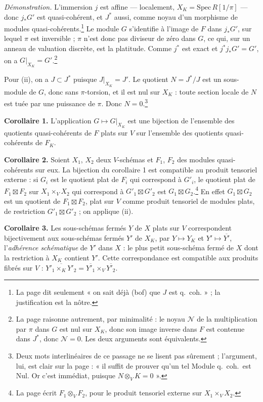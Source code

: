 \documentclass[11pt,a4paper]{article}
\begin{document}
\emph{Démonstration.} L'immersion $j$ est affine --- localement,
$X_K = \mathrm{Spec}\, R[1/\pi]$ --- donc $j_{*}G'$ est quasi-cohérent, et
$J^{*}$ aussi, comme noyau d'un morphisme de modules
quasi-cohérents.\footnote{La page dit seulement « on sait déjà (bof) que $J$
est q.\ coh. » ; la justification est la nôtre.} Le module $G$ s'identifie à
l'image de $F$ dans $j_{*}G'$, sur lequel $\pi$ est inversible ; $\pi$ n'est
donc pas diviseur de zéro dans $G$, ce qui, sur un anneau de valuation
discrète, est la platitude. Comme $j^{*}$ est exact et $j^{*}j_{*}G' = G'$, on
a $G|_{X_K} = G'$.\footnote{La page raisonne autrement, par minimalité : le
noyau $\mathcal{N}$ de la multiplication par $\pi$ dans $G$ est nul sur $X_K$,
donc son image inverse dans $F$ est contenue dans $J^{*}$, donc
$\mathcal{N} = 0$. Les deux arguments sont équivalents.}

Pour (ii), on a $J \subset J^{*}$ puisque $J|_{X_K} = J'$. Le quotient
$N = J^{*}/J$ est un sous-module de $G$, donc sans $\pi$-torsion, et il est nul
sur $X_K$ : toute section locale de $N$ est tuée par une puissance de $\pi$.
Donc $N = 0$.\footnote{Deux mots interlinéaires de ce passage ne se lisent pas
sûrement ; l'argument, lui, est clair sur la page : « il suffit de prouver
qu'un tel Module q.\ coh.\ est Nul. Or c'est immédiat, puisque
$N \otimes_V K = 0$ ».}

\textbf{Corollaire 1.} L'application $G \mapsto G|_{X_K}$ est une bijection de
l'ensemble des quotients quasi-cohérents de $F$ plats sur $V$ sur l'ensemble
des quotients quasi-cohérents de $F_K$.

\textbf{Corollaire 2.} Soient $X_1$, $X_2$ deux $V$-schémas et $F_1$, $F_2$
des modules quasi-cohérents sur eux. La bijection du corollaire 1 est
compatible au produit tensoriel externe : si $G_i$ est le quotient plat de
$F_i$ qui correspond à $G'_i$, le quotient plat de $F_1 \boxtimes F_2$ sur
$X_1 \times_V X_2$ qui correspond à $G'_1 \boxtimes G'_2$ est
$G_1 \boxtimes G_2$.\footnote{La page écrit $F_1 \otimes_V F_2$, pour le
produit tensoriel externe sur $X_1 \times_V X_2$.} En effet $G_1 \boxtimes G_2$
est un quotient de $F_1 \boxtimes F_2$, plat sur $V$ comme produit tensoriel
de modules plats, de restriction $G'_1 \boxtimes G'_2$ ; on applique (ii).

\textbf{Corollaire 3.} Les sous-schémas fermés $Y$ de $X$ plats sur $V$
correspondent bijectivement aux sous-schémas fermés $Y'$ de $X_K$, par
$Y \mapsto Y_K$ et $Y' \mapsto \overline{Y'}$, l'\emph{adhérence
schématique} de $Y'$ dans $X$ : le plus petit sous-schéma fermé de $X$ dont la
restriction à $X_K$ contient $Y'$. Cette correspondance est compatible aux
produits fibrés sur $V$ :
$\overline{Y'_1 \times_K Y'_2} = \overline{Y'_1} \times_V \overline{Y'_2}$.
\end{document}
